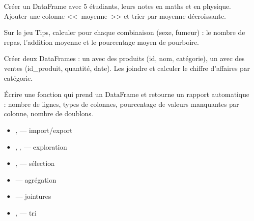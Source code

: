 \begin{exercice}[$\star$]
Cr\'eer un DataFrame avec 5 \'etudiants, leurs notes en maths et en physique. Ajouter une colonne <<~moyenne~>> et trier par moyenne d\'ecroissante.
\end{exercice}

\begin{exercice}[$\star\star$]
Sur le jeu Tips, calculer pour chaque combinaison (sexe, fumeur) : le nombre de repas, l'addition moyenne et le pourcentage moyen de pourboire.
\end{exercice}

\begin{exercice}[$\star\star$]
Cr\'eer deux DataFrames : un avec des produits (id, nom, cat\'egorie), un avec des ventes (id\_produit, quantit\'e, date). Les joindre et calculer le chiffre d'affaires par cat\'egorie.
\end{exercice}

\begin{exercice}[$\star\star\star$]
\'Ecrire une fonction qui prend un DataFrame et retourne un rapport automatique : nombre de lignes, types de colonnes, pourcentage de valeurs manquantes par colonne, nombre de doublons.
\end{exercice}

\begin{formules}[title=\textbf{Fonctions Pandas essentielles}]
\begin{itemize}
\item {},  --- import/export
\item {}, ,  --- exploration
\item {},  --- s\'election
\item {} --- agr\'egation
\item {} --- jointures
\item {},  --- tri
\end{itemize}
\end{formules}
